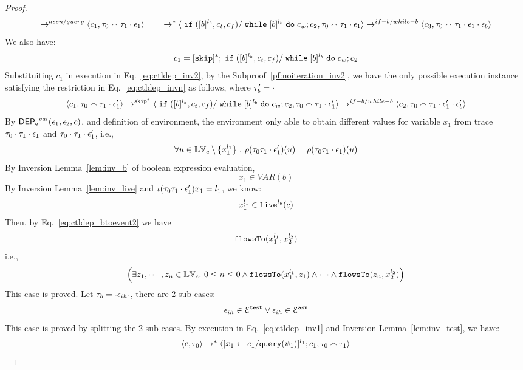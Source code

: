 \begin{proof}
\[\rightarrow^{assn/query}
 \langle c_1, \mathtt{\tau}_0 \smallfrown \mathtt{\tau}_1 \cdot \mathtt{\epsilon}_1 \rangle 
 \\ \qquad 
 \rightarrow^{*} 
  \langle \;\mathtt{if}\;([b]{}^{l_b}, c_t, c_f) / \;\mathtt{while}\; [b]{}^{l_b} \;\mathtt{do}\; c_w; {c}_2, 
  \mathtt{\tau}_0 \smallfrown \mathtt{\tau}_1 \cdot \mathtt{\epsilon}_1 \rangle 
  \rightarrow^{if-b / while-b} 
  \langle {c}_3,  \mathtt{\tau}_0 \smallfrown \mathtt{\tau}_1 \cdot \mathtt{\epsilon}_1 \cdot \mathtt{\epsilon}_b \rangle 
 \]
 We also have:
 \[
 c_1 = [\mathtt{skip}]^*;\;\mathtt{if}\;([b]{}^{l_b}, c_t, c_f) / \;\mathtt{while}\; [b]{}^{l_b} \;\mathtt{do}\; c_w; {c}_2
 \]
Substituiting $c_1$ in execution in Eq.~\ref{eq:ctldep_inv2}, by the Subproof~\ref{pf:noiteration_inv2}, 
we have the only possible execution instance satisfying 
the restriction in Eq.~\ref{eq:ctldep_invn} as follows, where $\mathtt{\tau}_b' = \cdot$
%
 \[
  \langle c_1, \mathtt{\tau}_0 \smallfrown \mathtt{\tau}_1 \cdot \mathtt{\epsilon}_1' \rangle 
  \rightarrow^{\mathtt{skip}^*} 
  \langle 
  \;\mathtt{if}\;([b]{}^{l_b}, c_t, c_f) / \;\mathtt{while}\; [b]{}^{l_b} \;\mathtt{do}\; c_w; {c}_2, 
  \mathtt{\tau}_0 \smallfrown \mathtt{\tau}_1 \cdot \mathtt{\epsilon}_1' \rangle 
  \rightarrow^{if-b / while-b} 
  \langle {c}_2,  \mathtt{\tau}_0 \smallfrown \mathtt{\tau}_1 \cdot \mathtt{\epsilon}_1' \cdot \mathtt{\epsilon}_b' \rangle 
 \]
By $\mathsf{DEP_{\mathtt{e}}}^{val}(\mathtt{\epsilon}_1, \mathtt{\epsilon}_2, c)$, and definition of environment, 
the environment only able to obtain different values for variable $x_1$ 
from trace $\mathtt{\tau}_0 \cdot \mathtt{\tau}_1 \cdot \mathtt{\epsilon}_1$ and 
$\mathtt{\tau}_0 \cdot \mathtt{\tau}_1 \cdot \mathtt{\epsilon}_1'$, i.e.,
\[
  \forall u \in \mathbb{LV}_c \setminus \{x_1^{l_1}\} ~.~
  \rho(\mathtt{\tau}_0 \mathtt{\tau}_1 \cdot \mathtt{\epsilon}_1') (u) =  
  \rho(\mathtt{\tau}_0 \mathtt{\tau}_1 \cdot \mathtt{\epsilon}_1) (u)
\]
%
By {Inversion Lemma~\ref{lem:inv_b}} of boolean expression evaluation,
 \[
  x_1 \in VAR(b)
 \]
 By Inversion Lemma~\ref{lem:inv_live} and $\iota(\mathtt{\tau}_0 \mathtt{\tau}_1 \cdot \mathtt{\epsilon}_1') x_1 = l_1$, we know:
\[
  x_1^{l_1} \in \mathtt{live}^{l_b}(c)
\]
 Then, by Eq.~\ref{eq:ctldep_btoevent2} we have
 \[
 \mathtt{flowsTo}(x_1^{l_1}, x_2^{l_2})
 \]
 i.e.,
 \[
 \Big( \exists z_1, \cdots, z_n \in \mathbb{LV}_{{c}}. ~ 0 \leq n \leq 0 \land
  \mathtt{flowsTo}(x_1^{l_1}, z_1) 
  \land \cdots \land \mathtt{flowsTo}(z_n, x_2^{l_2}) \Big)
 \]
 This case is proved.
%
 Let $\mathtt{\tau}_b = \cdot \mathtt{\epsilon}_{ih} \cdot$, there are 2 sub-cases: 
 \[
 \mathtt{\epsilon}_{ih} \in \mathcal{E}^{\mathtt{{test}}} \lor \mathtt{\epsilon}_{ih} \in \mathcal{E}^{\mathtt{{asn}}}
 \]
 This case is proved by splitting the 2 sub-cases.
By execution in Eq.~\ref{eq:ctldep_inv1} and {Inversion Lemma~\ref{lem:inv_test}}, we have:
%
\[
  \begin{array}{l}   
  \langle {c}, \mathtt{\tau}_0 \rangle 
  \rightarrow^{*} 
  \langle [\mathrel{ {x}_1 \leftarrow e_1 / {\tt query}(\psi_1) }]^{l_1} ; {c}_1, \mathtt{\tau}_0 \smallfrown \mathtt{\tau}_1 \rangle  

\end{array}\]
\end{proof}
